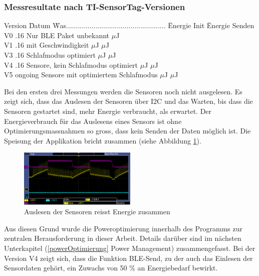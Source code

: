 \subsubsection*{Messresultate nach TI-SensorTag-Versionen}
\begin{tabbing}
    Version   \quad\= Datum    \quad\= Was................................................... \quad\= Energie Init    \quad\=  Energie Senden \\[0.8ex]
    V0        .16  \> Nur BLE Paket      \> unbekannt             $\mu$J \\
    V1        .16  \> mit Geschwindigkeit       $\mu$J             $\mu$J \\
    V3        .16   \> Schlafmodus optimiert      $\mu$J             $\mu$J \\
    V4        .16     Sensore, kein Schlafmodus optimiert      $\mu$J             $\mu$J \\
    V5        \> ongoing     Sensore mit optimiertem Schlafmodus      $\mu$J             $\mu$J \\
\end{tabbing}

Bei den ersten drei Messungen werden die Sensoren noch nicht ausgelesen. Es zeigt sich, dass das Auslesen der Sensoren über I2C und das Warten, bis dass die Sensoren gestartet sind,  mehr Energie verbraucht, als erwartet. Der Energieverbrauch für das Auslesens eines Sensors ist ohne Optimierungsmassnahmen so gross, dass kein Senden der Daten möglich ist. Die Speisung der Applikation bricht zusammen (siehe Abbildung \ref{i2c_problem}).

\begin{figure}[ht]
    \includegraphics[width=0.5\textwidth]{3Vorgehen/imag/pic4VSUPbrichtEin.PNG} 
    \caption{Auslesen der Sensoren reisst Energie zusammen}
    \label{i2c_problem}
\end{figure}



Aus diesen Grund wurde die Poweroptimierung innerhalb des Programms zur zentralen Herausforderung in dieser Arbeit. Details darüber sind im nächsten Unterkapitel (\ref{powerOptimierung} Power Management) zusammengefasst. Bei der Version V4 zeigt sich, dass die Funktion BLE-Send, zu der auch das Einlesen der Sensordaten gehört, ein Zuwachs von 50 \% an Energiebedarf bewirkt. 



